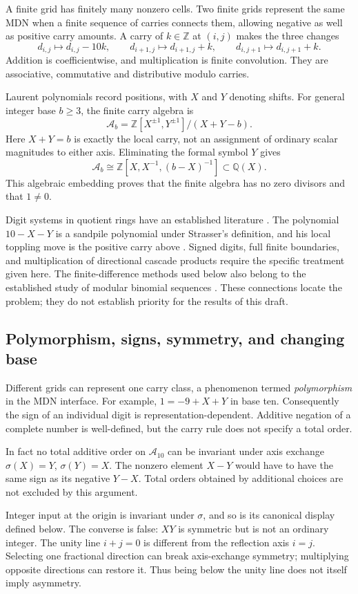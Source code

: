 \documentclass[11pt]{article}
\newcommand{\Z}{\mathbb Z}
\newcommand{\Q}{\mathbb Q}
\newcommand{\A}{\mathcal A}
\begin{document}
A finite grid has finitely many nonzero cells. Two finite grids represent
the same MDN when a finite sequence of carries connects them, allowing
negative as well as positive carry amounts. A carry of $k\in\Z$ at
$(i,j)$ makes the three changes
\[
 d_{i,j}\mapsto d_{i,j}-10k,\qquad
 d_{i+1,j}\mapsto d_{i+1,j}+k,\qquad
 d_{i,j+1}\mapsto d_{i,j+1}+k.
\]
Addition is coefficientwise, and multiplication is finite convolution.
They are associative, commutative and distributive modulo carries.

Laurent polynomials record positions, with $X$ and $Y$ denoting shifts.
For general integer base $b\ge3$, the finite carry algebra is
\[
 \A_b=\Z[X^{\pm1},Y^{\pm1}]/(X+Y-b).
\]
Here $X+Y=b$ is exactly the local carry, not an assignment of ordinary
scalar magnitudes to either axis. Eliminating the formal symbol $Y$ gives
\[
 \A_b\cong\Z[X,X^{-1},(b-X)^{-1}]\subset\Q(X).
\]
This algebraic embedding proves that the finite algebra has no zero
divisors and that $1\ne0$.

Digit systems in quotient rings have an established literature
\cite{digits}. The polynomial $10-X-Y$ is a sandpile polynomial under
Strasser's definition, and his local toppling move is the positive carry
above \cite{sandpile}. Signed digits, full finite boundaries, and
multiplication of directional cascade products require the specific
treatment given here. The finite-difference methods used below also belong
to the established study of modular binomial sequences \cite{binomials}.
These connections locate the problem; they do not establish priority for
the results of this draft.

\subsection{Polymorphism, signs, symmetry, and changing base}
Different grids can represent one carry class, a phenomenon termed
\emph{polymorphism} in the MDN interface. For example,
$1=-9+X+Y$ in base ten. Consequently the sign of an individual digit is
representation-dependent. Additive negation of a complete number is
well-defined, but the carry rule does not specify a total order.

In fact no total additive order on $\A_{10}$ can be invariant under
axis exchange $\sigma(X)=Y$, $\sigma(Y)=X$. The nonzero element $X-Y$
would have to have the same sign as its negative $Y-X$. Total orders
obtained by additional choices are not excluded by this argument.

Integer input at the origin is invariant under $\sigma$, and so is its
canonical display defined below. The converse is false: $XY$ is symmetric
but is not an ordinary integer. The unity line $i+j=0$ is different from
the reflection axis $i=j$. Selecting one fractional direction can break
axis-exchange symmetry; multiplying opposite directions can restore it.
Thus being below the unity line does not itself imply asymmetry.
\end{document}
